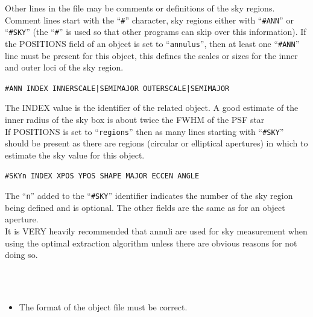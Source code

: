 \documentclass[twoside,11pt]{article}
\renewcommand{\_}{\texttt{\symbol{95}}}
\newcommand{\ft}[1]{``\texttt{#1}''}
\newcommand{\sstdiytopic}[2]{\item[{\hspace{-0.35em}#1\hspace{-0.35em}:}]
\mbox{} \\[1.3ex] #2}
\newcommand{\sstitemlist}[1]{
  \mbox{} \\
  \vspace{-3.5ex}
  \begin{itemize}
     #1
  \end{itemize}
}
\newcommand{\sstitem}{\item}
\newcommand{\sstdiytopic}[2]{\item[{#1}] #2 }
\newcommand{\sstitemlist}[1]{
      \begin{itemize}
         #1
      \end{itemize}
      \\
   }
\newcommand{\sstitem}{\item}
\begin{document}
{{{      Other lines in the file may be comments or definitions of the sky
      regions. Comment lines start with the \ft{\#} character, sky regions
      either with \ft{\#ANN} or \ft{\#SKY} (the \ft{\#} is used so that other
      programs can skip over this information). If the POSITIONS field
      of an object is set to \ft{annulus}, then at least one \ft{\#ANN} line must
      be present for this object, this defines the scales or sizes for
      the inner and outer loci of the sky region.
       \begin{description}
          \item  \hspace*{1cm} \texttt{\#ANN INDEX INNER\_SCALE|SEMI\_MAJOR OUTER\_SCALE|SEMI\_MAJOR}
       \end{description}
      The INDEX value is the identifier of the related object. A good
      estimate of the inner radius of the sky box is about twice the
      FWHM of the PSF star\\

      If POSITIONS is set to \ft{regions} then as many lines starting with
      \ft{\#SKY} should be present as there are regions (circular or
      elliptical apertures) in which to estimate the sky value for this
      object.
       \begin{description}
          \item  \hspace*{1cm} \texttt{\#SKYn INDEX XPOS YPOS SHAPE MAJOR ECCEN
                                        ANGLE}
       \end{description}
      The \ft{n} added to the \ft{\#SKY} identifier indicates the number of
      the sky region being defined and is optional. The other fields
      are the same as for an object aperture.\\

      It is VERY heavily recommended that annuli are used for sky measurement
      when using the optimal extraction algorithm unless there are obvious
      reasons for not doing so.          
        
    }
   }
   \sstdiytopic{
      Pitfalls
   }{
      \sstitemlist{
         \sstitem
         The format of the object file must be correct.
      }
   }
}
\newpage
\end{document}
